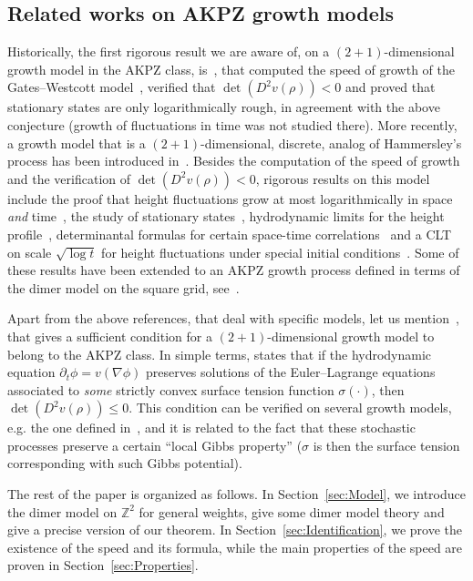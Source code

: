 \documentclass[10pt]{amsart}
\theoremstyle{definition}\newtheorem{defi}[theo]{Definition}\newtheorem{rema}[theo]{Remark}\newtheorem{exam}[theo]{Example}\newtheorem{exem}[theo]{Example}\newtheorem{nota}[theo]{Notation}
\newcommand{\bbZ}{\mathbb{Z}}
\begin{document}
\subsection{Related works on AKPZ growth models}\label{sec:relw}
Historically, the first rigorous result we are aware of, on a $(2+1)$-dimensional growth model in the AKPZ class, is~\cite{prahofer1997exactly}, that computed the speed of growth of the Gates--Westcott model~\cite{gates1995stationary}, verified that $\det(D^2 v(\rho))< 0$ and proved that stationary states are only logarithmically rough, in agreement with the above conjecture (growth of fluctuations in time was not studied there). More recently, a growth model that is a $(2+1)$-dimensional, discrete, analog of Hammersley's process has been introduced in~\cite{BF08}. Besides the computation of the speed of growth and the verification of $\det(D^2 v(\rho))< 0$, rigorous results on this model include the proof that height fluctuations grow at most logarithmically in space \emph{and} time~\cite{BF08,toninelli20172+}, the study of stationary states~\cite{toninelli20172+}, hydrodynamic limits for the height profile~\cite{BF08,legras2019hydrodynamic}, determinantal formulas for certain space-time correlations~\cite{BF08} and a CLT on scale $\sqrt{\log t}$ for height fluctuations under special initial conditions~\cite{BF08}. Some of these results have been extended to an AKPZ growth process defined in terms of the dimer model on the square grid, see~\cite{chhita2017speed}.



Apart from the above references, that deal with specific models, let us mention~\cite{borodin2018two}, that gives a sufficient condition for a $(2+1)$-dimensional growth model to belong to the AKPZ class. In simple terms, \cite[Theorem~2.1]{borodin2018two} states that if the hydrodynamic equation $\partial_t \phi=v(\nabla\phi)$ preserves solutions of the Euler--Lagrange equations associated to \emph{some} strictly convex surface tension function $\sigma(\cdot)$, then $\det(D^2 v(\rho))\le 0$. This condition can be verified on several growth models, e.g. the one defined in~\cite{BF08}, and it is related to the fact that these stochastic processes preserve a certain ``local Gibbs property'' ($\sigma$ is then the surface tension corresponding with such Gibbs potential).

The rest of the paper is organized as follows. In Section~\ref{sec:Model}, we introduce the dimer model on $\bbZ^2$ for general weights, give some dimer model theory and give a precise version of our theorem. In Section~\ref{sec:Identification}, we prove the existence of the speed and its formula, while the main properties of the speed are proven in Section~\ref{sec:Properties}.
\end{document}
